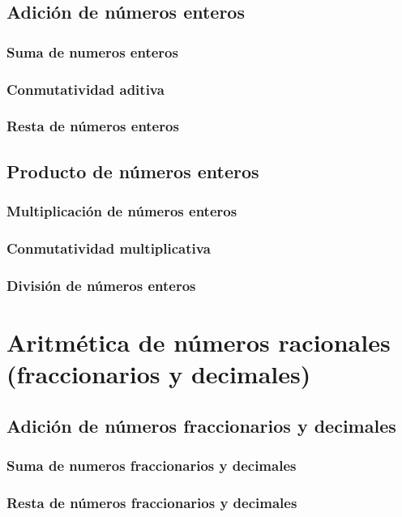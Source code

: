 \documentclass[12pt]{book}
\begin{document}
\begin{mainmatter}
    \subsection{Adición de n\'umeros enteros}
    \subsubsection{Suma de numeros enteros}
    \subsubsection{Conmutatividad aditiva}
    \subsubsection{Resta de n\'umeros enteros}
    \subsection{Producto de n\'umeros enteros}
    \subsubsection{Multiplicación de números enteros}
    \subsubsection{Conmutatividad multiplicativa}
    \subsubsection{División de números enteros}

    \section{Aritmética de números racionales (fraccionarios y decimales)}

    \subsection{Adición de n\'umeros fraccionarios y decimales}
    \subsubsection{Suma de numeros fraccionarios y decimales}
    \subsubsection{Resta de n\'umeros fraccionarios y decimales}

\end{mainmatter}
\end{document}
